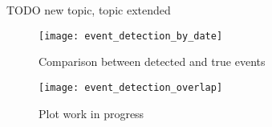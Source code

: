 TODO new topic, topic extended

\begin{figure}[h]
    \centering
    \texttt{[image: event\_detection\_by\_date]}
    \caption{Comparison between detected and true events}
    \label{fig:event_detection_by_date}
\end{figure}

\begin{figure}[h]
    \centering
    \texttt{[image: event\_detection\_overlap]}
    \caption{Plot work in progress}
    \label{fig:event_detection_overlap}
\end{figure}


